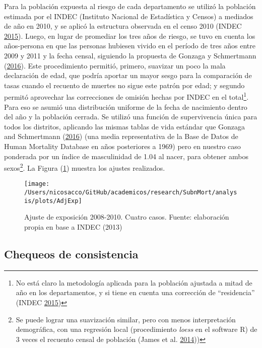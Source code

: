 \documentclass[12pt,]{article}
\begin{document}
Para la población expuesta al riesgo de cada departamento se utilizó la
población estimada por el INDEC (Instituto Nacional de Estadística y
Censos) a mediados de año en 2010, y se aplicó la estructura observada
en el censo 2010 (INDEC \protect\hyperlink{ref-INDEC2015}{2015}). Luego,
en lugar de promediar los tres años de riesgo, se tuvo en cuenta los
años-persona en que las personas hubiesen vivido en el período de tres
años entre 2009 y 2011 y la fecha censal, siguiendo la propuesta de
Gonzaga y Schmertmann
(\protect\hyperlink{ref-Gonzaga_Schmertmann_2016}{2016}). Este
procedimiento permitió, primero, suavizar un poco la mala declaración de
edad, que podría aportar un mayor sesgo para la comparación de tasas
cuando el recuento de muertes no sigue este patrón por edad; y segundo
permitó aprovechar las correcciones de omisión hechas por INDEC en el
total\footnote{No está claro la metodología aplicada para la población
  ajustada a mitad de año en los departamentos, y si tiene en cuenta una
  corrección de ``residencia'' (INDEC
  \protect\hyperlink{ref-INDEC2015}{2015})}. Para eso se asumió una
distribución uniforme de la fecha de nacimiento dentro del año y la
población cerrada. Se utilizó una función de supervivencia única para
todos los distritos, aplicando las mismas tablas de vida estándar que
Gonzaga and Schmertmann
(\protect\hyperlink{ref-Gonzaga_Schmertmann_2016}{2016}) (una media
representativa de la Base de Datos de Human Mortality Database en años
posteriores a 1969) pero en nuestro caso ponderada por un índice de
masculinidad de 1.04 al nacer, para obtener ambos sexos\footnote{Se
  puede lograr una suavización similar, pero con menos interpretación
  demográfica, con una regresión local (procedimiento \emph{loess} en el
  software R) de 3 veces el recuento censal de población (James et al.
  \protect\hyperlink{ref-James2014}{2014}))}. La Figura
(\ref{fig:AdjExp}) muestra los ajustes realizados.

\begin{figure}

{\centering \texttt{[image: /Users/nicosacco/GitHub/academicos/research/SubnMort/analysis/plots/AdjExp]} 

}

\caption{Ajuste de exposición 2008-2010. Cuatro casos. Fuente: elaboración propia en base a INDEC (2013)}\label{fig:AdjExp}
\end{figure}

\hypertarget{chequeos-de-consistencia}{%
\subsection{Chequeos de consistencia}\label{chequeos-de-consistencia}}
\end{document}
